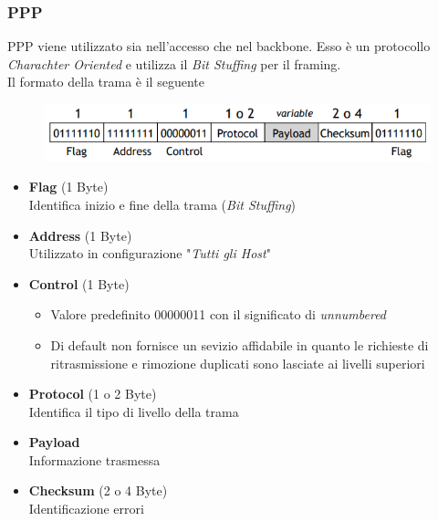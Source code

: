 \documentclass{article}
\begin{document}
            \subsubsection{PPP}
                PPP viene utilizzato sia nell'accesso che nel backbone. Esso è un protocollo \textit{Charachter Oriented} e utilizza il \textit{Bit Stuffing} per il framing. \\
                Il formato della trama è il seguente
                \begin{figure}[H]
                    \centering
                    \includegraphics[width=\textwidth]{pic/trama_ppp.png}
                    \label{Trama PPP}
                \end{figure}
                \begin{itemize}
                    \item \textbf{Flag} (1 Byte) \\
                          Identifica inizio e fine della trama (\textit{Bit Stuffing})
                    \item \textbf{Address} (1 Byte) \\
                          Utilizzato in configurazione "\textit{Tutti gli Host}"
                    \item \textbf{Control} (1 Byte)
                          \begin{itemize}
                              \item Valore predefinito 00000011 con il significato di \textit{unnumbered}
                              \item Di default non fornisce un sevizio affidabile in quanto le richieste di ritrasmissione e rimozione duplicati sono lasciate ai livelli superiori 
                          \end{itemize}
                    \item \textbf{Protocol} (1 o 2 Byte) \\
                          Identifica il tipo di livello della trama 
                    \item \textbf{Payload} \\
                          Informazione trasmessa
                    \item \textbf{Checksum} (2 o 4 Byte) \\
                          Identificazione errori
                \end{itemize}
\end{document}

